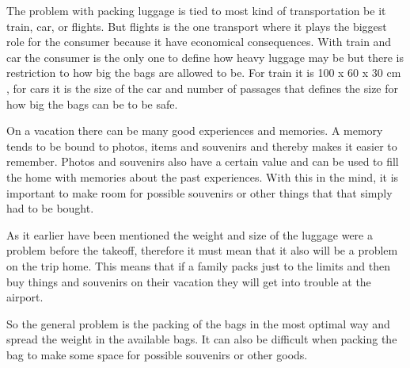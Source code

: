 The problem with packing luggage is tied to most kind of transportation be it train, car, or flights. But flights is the one transport where it plays the biggest role for the consumer because it have economical consequences. With train and car the consumer is the only one to define how heavy luggage may be but there is restriction to how big the bags are allowed to be. For train it is 100 x 60 x 30 cm \citep{rulestrain}, for cars it is the size of the car and number of passages that defines the size for how big the bags can be to be safe.

On a vacation there can be many good experiences and memories. A memory tends to be bound to photos, items and souvenirs and thereby makes it easier to remember. Photos and souvenirs also have a certain value and can be used to fill the home with memories about the past experiences.
With this in the mind, it is important to make room for possible souvenirs or other things that that simply had to be bought.

As it earlier have been mentioned the weight and size of the luggage were a problem before the takeoff, therefore it must mean that it also will be a problem on the trip home.
This means that if a family packs just to the limits and then buy things and souvenirs on their vacation they will get into trouble at the airport.

So the general problem is the packing of the bags in the most optimal way and spread the weight in the available bags. It can also be difficult when packing the bag to make some space for possible souvenirs or other goods.